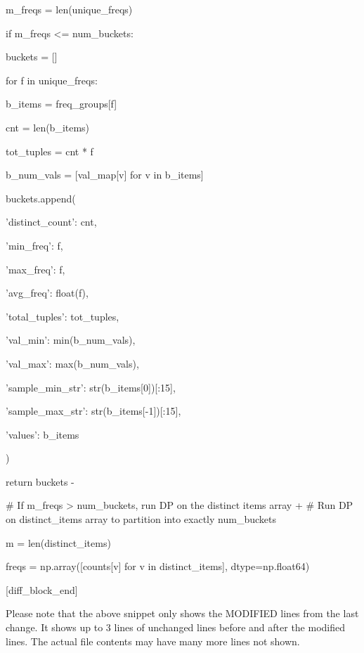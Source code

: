 \documentclass[11pt,a4paper]{article}
\begin{document}
m\_freqs = len(unique\_freqs)


\begin{itemize}
\item    if m\_freqs <= num\_buckets:
\item        buckets = []
\item        for f in unique\_freqs:
\item            b\_items = freq\_groups[f]
\item            cnt = len(b\_items)
\item            tot\_tuples = cnt * f
\item            b\_num\_vals = [val\_map[v] for v in b\_items]
\item            buckets.append({
\item                'distinct\_count': cnt,
\item                'min\_freq': f,
\item                'max\_freq': f,
\item                'avg\_freq': float(f),
\item                'total\_tuples': tot\_tuples,
\item                'val\_min': min(b\_num\_vals),
\item                'val\_max': max(b\_num\_vals),
\item                'sample\_min\_str': str(b\_items[0])[:15],
\item                'sample\_max\_str': str(b\_items[-1])[:15],
\item                'values': b\_items
\item            })
\item        return buckets
-

\item    \# If m\_freqs > num\_buckets, run DP on the distinct items array
+    \# Run DP on distinct\_items array to partition into exactly num\_buckets

m = len(distinct\_items)

freqs = np.array([counts[v] for v in distinct\_items], dtype=np.float64)

\end{itemize}

[diff\_block\_end]


Please note that the above snippet only shows the MODIFIED lines from the last change. It shows up to 3 lines of unchanged lines before and after the modified lines. The actual file contents may have many more lines not shown.
\end{document}
